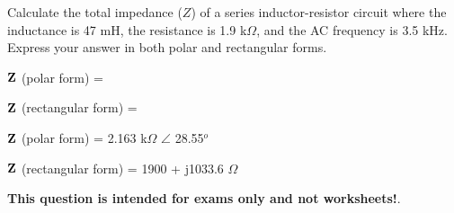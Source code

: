 

Calculate the total impedance ($Z$) of a series inductor-resistor circuit where the inductance is 47 mH, the resistance is 1.9 k$\Omega$, and the AC frequency is 3.5 kHz.  Express your answer in both polar and rectangular forms.

\vskip 10pt

${\bf Z}$ (polar form) = 

\vskip 10pt

${\bf Z}$ (rectangular form) = 







${\bf Z}$ (polar form) = 2.163 k$\Omega$ $\angle$ 28.55$^{o}$

\vskip 10pt

${\bf Z}$ (rectangular form) = 1900 + j1033.6 $\Omega$







{\bf This question is intended for exams only and not worksheets!}.



